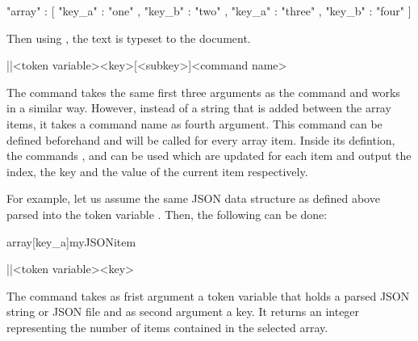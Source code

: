 \documentclass[a4paper]{article}
\begin{document}
{{\begin{codeexample}
{
  "array" : [
    {
      "key_a" : "one" ,
      "key_b" : "two"
    } ,
    {
      "key_a" : "three" ,
      "key_b" : "four"
    }
  ]
}
\end{codeexample}

Then using , the text  is typeset to the document. 

\begin{macrodef}
|\JSONParseUseArrayValues|{<token variable>}{<key>}[<subkey>]{<command name>}
\end{macrodef}
The command \macro{\JSONParseUseArrayValues} takes the same first three arguments as the command \macro{\JSONParseGetArrayValues} and works in a similar way. However, instead of a string that is added between the array items, it takes a command name as fourth argument. This command can be defined beforehand and will be called for every array item. Inside its defintion, the commands \macro{\JSONParseArrayIndex}, \macro{\JSONParseArrayKey} and \macro{\JSONParseArrayValue} can be used which are updated for each item and output the index, the key and the value of the current item respectively. 

For example, let us assume the same JSON data structure as defined above parsed into the token variable \macro{\myJSONdata}. Then, the following can be done:


\begin{codeexamplecolumns}
\newcommand{\myJSONitem}{
  \item \emph{\JSONParseArrayValue}
}

\begin{itemize}
  \JSONParseUseArrayValues{\myJSONdata}
    {array}[key_a]{myJSONitem}
\end{itemize}
\end{codeexamplecolumns}

\begin{macrodef}
|\JSONParseGetArrayCount|{<token variable>}{<key>}
\end{macrodef}
The command \macro{\JSONParseGetArrayCount} takes as frist argument a token variable that holds a parsed JSON string or JSON file and as second argument a key. It returns an integer representing the number of items contained in the selected array.

}}
\end{document}
